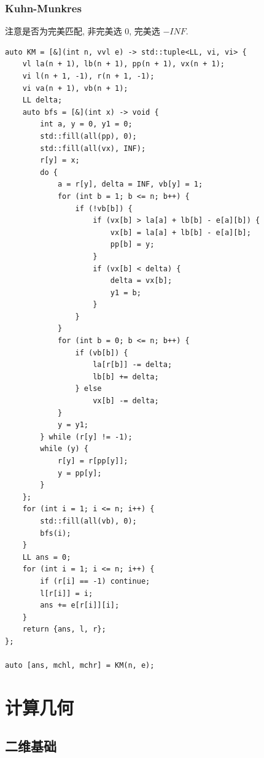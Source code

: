 \documentclass[UTF8, a4paper, titlepage, twoside]{ctexart}
\begin{document}
\subsubsection{Kuhn-Munkres}
注意是否为完美匹配, 非完美选 $0$, 完美选 $-INF$. 
\begin{lstlisting}[style=cpp]
auto KM = [&](int n, vvl e) -> std::tuple<LL, vi, vi> {
    vl la(n + 1), lb(n + 1), pp(n + 1), vx(n + 1);
    vi l(n + 1, -1), r(n + 1, -1);
    vi va(n + 1), vb(n + 1);
    LL delta;
    auto bfs = [&](int x) -> void {
        int a, y = 0, y1 = 0;
        std::fill(all(pp), 0);
        std::fill(all(vx), INF);
        r[y] = x;
        do {
            a = r[y], delta = INF, vb[y] = 1;
            for (int b = 1; b <= n; b++) {
                if (!vb[b]) {
                    if (vx[b] > la[a] + lb[b] - e[a][b]) {
                        vx[b] = la[a] + lb[b] - e[a][b];
                        pp[b] = y;
                    }
                    if (vx[b] < delta) {
                        delta = vx[b];
                        y1 = b;
                    }
                }
            }
            for (int b = 0; b <= n; b++) {
                if (vb[b]) {
                    la[r[b]] -= delta;
                    lb[b] += delta;
                } else
                    vx[b] -= delta;
            }
            y = y1;
        } while (r[y] != -1);
        while (y) {
            r[y] = r[pp[y]];
            y = pp[y];
        }
    };
    for (int i = 1; i <= n; i++) {
        std::fill(all(vb), 0);
        bfs(i);
    }
    LL ans = 0;
    for (int i = 1; i <= n; i++) {
        if (r[i] == -1) continue;
        l[r[i]] = i;
        ans += e[r[i]][i];
    }
    return {ans, l, r};
};

auto [ans, mchl, mchr] = KM(n, e);
\end{lstlisting}


\newpage
\section{ 计算几何 }
\subsection{ 二维基础 }
\end{document}
